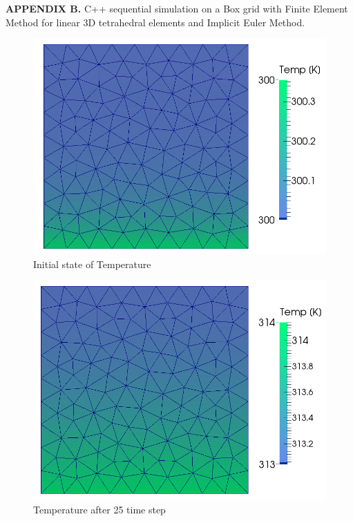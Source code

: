 \documentclass[12pt]{article}
\begin{document}
	
\textbf{APPENDIX B.} C++ sequential simulation on a Box grid with Finite Element Method for linear 3D tetrahedral elements and Implicit Euler Method.
	
	\begin{figure}[H]
    \includegraphics[scale=0.4]{box-sequential/boxSequential_ts1.png}
    \centering
    \caption{Initial state of Temperature}
	\end{figure}	
	\begin{figure}[H]
    \includegraphics[scale=0.4]{box-sequential/boxSequential_ts25.png}
    \centering
    \caption{Temperature after 25 time step}
	\end{figure}	
\end{document}
